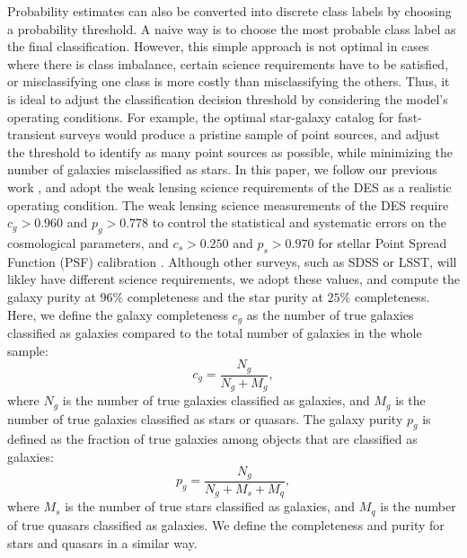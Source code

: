 \documentclass[fleqn,usenatbib]{mnras}
\begin{document}
Probability estimates can also be converted into discrete class labels by choosing a probability threshold.
A naive way is to choose the most probable class label as the final classification.
However, this simple approach is not optimal in cases where there is class imbalance,
certain science requirements have to be satisfied, or misclassifying one class is more costly than misclassifying the others.
Thus, it is ideal to adjust the classification decision threshold by considering the model's operating conditions.
For example, the optimal star-galaxy catalog for fast-transient surveys would produce a pristine sample of point sources, and
\citet{miller2017preparing} adjust the threshold to identify as many point sources as possible, while minimizing the number
of galaxies misclassified as stars.
In this paper, we follow our previous work \citep{kim2015hybrid}, and adopt the weak lensing science requirements of the DES
as a realistic operating condition.
The weak lensing science measurements of the DES require $c_g > 0.960$ and $p_g > 0.778$ to control the statistical and systematic errors
on the cosmological parameters, and $c_s > 0.250$ and $p_s > 0.970$ for stellar Point Spread Function (PSF) calibration
\citep{soumagnac2013star}.
Although other surveys, such as SDSS or LSST, will likley have different science requirements,
we adopt these values,
and compute the galaxy purity at $96\%$ completeness and the star purity at $25\%$ completeness.
Here, we define the galaxy completeness $c_g$ as the number of true galaxies classified as galaxies
compared to the total number of galaxies in the whole sample:
\begin{equation}
c_g = \frac{ N_g }{ N_g + M_g },
\end{equation}
where $N_g$ is the number of true galaxies classified as galaxies, and
$M_g$ is the number of true galaxies classified as stars or quasars.
The galaxy purity $p_g$ is defined as the fraction of true galaxies among objects that are classified as galaxies:
\begin{equation}
p_g = \frac{ N_g }{ N_g + M_s + M_q },
\end{equation}
where $M_s$ is the number of true stars classified as galaxies,
and $M_q$ is the number of true quasars classified as galaxies.
We define the completeness and purity for stars and quasars in a similar way.
\end{document}
